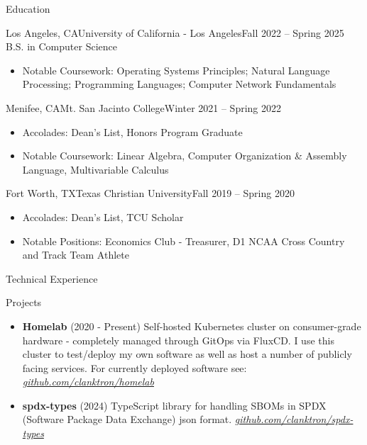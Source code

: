 \documentclass[]{resume}
\begin{document}
	\begin{cvsection}{Education}
		\begin{cvsubsection}{Los Angeles, CA}{University of California - Los Angeles}{Fall 2022 -- Spring 2025}
            B.S. in Computer Science
			\begin{itemize}
				\item Notable Coursework: Operating Systems Principles; Natural Language Processing; Programming Languages; Computer Network Fundamentals
			\end{itemize}
		\end{cvsubsection}
        
        \begin{cvsubsection}{Menifee, CA}{Mt. San Jacinto College}{Winter 2021 -- Spring 2022}
            \begin{itemize}
                \item Accolades: Dean's List, Honors Program Graduate
                \item Notable Coursework: Linear Algebra, Computer Organization \& Assembly Language, Multivariable Calculus
            \end{itemize}
        \end{cvsubsection}
    
        \begin{cvsubsection}{Fort Worth, TX}{Texas Christian University}{Fall 2019 -- Spring 2020}
            \begin{itemize}
                \item Accolades: Dean's List, TCU Scholar
                \item Notable Positions: Economics Club - Treasurer, D1 NCAA Cross Country and Track Team Athlete
            \end{itemize}
        \end{cvsubsection}
	\end{cvsection}
	
	\begin{cvsection}{Technical Experience}
		\begin{cvsubsection}{Projects}{}{}
			\begin{itemize}
            \item \textbf{Homelab} (2020 - Present) Self-hosted Kubernetes cluster on consumer-grade hardware - completely managed through GitOps via FluxCD. I use this cluster to test/deploy my own software as well as host a number of publicly facing services. For currently deployed software see: \href{https://github.com/clanktron/homelab}{\textit{github.com/clanktron/homelab}}
                \item \textbf{spdx-types} (2024) TypeScript library for handling SBOMs in SPDX (Software Package Data Exchange) json format. \href{https://github.com/clanktron/spdx-types}{\textit{github.com/clanktron/spdx-types}}
			\end{itemize}
		\end{cvsubsection}
	\end{cvsection}
	
\end{document}
